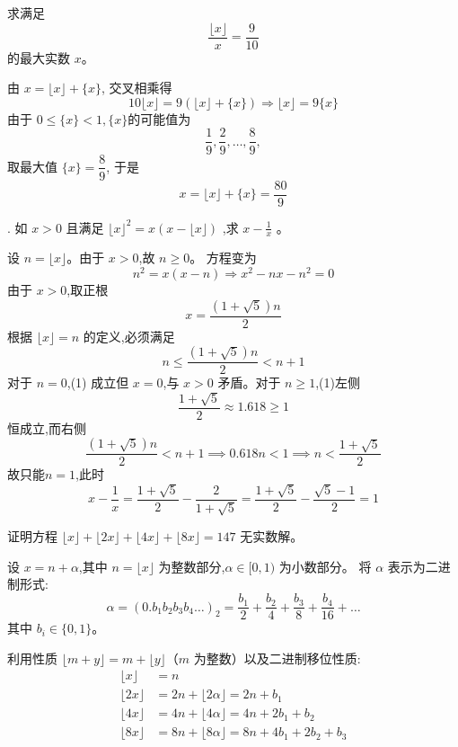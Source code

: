 \begin{questions}
    \question 求满足
    \[
    \frac{\lfloor x \rfloor}{x} = \frac{9}{10}
    \]
    的最大实数 $x$。
    \begin{solution}
        由 $x = \lfloor x \rfloor + \{x\}$, 交叉相乘得
        \[
        10 \lfloor x \rfloor = 9 (\lfloor x \rfloor + \{x\}) \Rightarrow \lfloor x \rfloor = 9 \{x\}
        \]
        由于 $0 \le \{x\} < 1,\{x\}$的可能值为
        \[
        \frac{1}{9}, \frac{2}{9}, \dots, \frac{8}{9}, 
        \]
        取最大值 $\{x\} = \dfrac{8}{9}$, 于是
        \[
        x = \lfloor x \rfloor + \{x\} = \frac{80}{9}
        \]
    \end{solution}
    
    . 如 $x > 0$ 且满足 $\lfloor x \rfloor^2 = x(x - \lfloor x \rfloor)$ ,求 $x - \frac{1}{x}$ 。
    \begin{solution}
        设 $n = \lfloor x \rfloor$。由于 $x > 0$,故 $n \ge 0$。
        方程变为
        \[ 
        n^2 = x(x - n) \Rightarrow x^2 - nx - n^2 = 0
        \]
        由于 $x > 0$,取正根
        \[ 
        x = \frac{(1 + \sqrt{5})n}{2} 
        \]
        根据 $\lfloor x \rfloor = n$ 的定义,必须满足
        \[ 
        n \le \frac{(1 + \sqrt{5})n}{2} < n + 1 \tag{1}
        \]
        对于 $n=0$,(1) 成立但 $x=0$,与 $x>0$ 矛盾。对于 $n \ge 1$,(1)左侧 
        \[
        \frac{1+\sqrt{5}}{2} \approx 1.618 \ge 1
        \]
        恒成立,而右侧
        \[
        \frac{(1 + \sqrt{5})n}{2} < n + 1 \implies 0.618n < 1 \implies n < \frac{1 + \sqrt{5}}{2}
        \]
        故只能$n = 1$,此时
        \[
        x - \frac{1}{x} = \frac{1 + \sqrt{5}}{2} - \frac{2}{1 + \sqrt{5}} = \frac{1 + \sqrt{5}}{2} - \frac{\sqrt{5} - 1}{2} = 1
        \]
    \end{solution}

\question 证明方程 $\lfloor x \rfloor + \lfloor 2x \rfloor + \lfloor 4x \rfloor + \lfloor 8x \rfloor = 147$ 无实数解。
\begin{solution}
    设 $x = n + \alpha$,其中 $n = \lfloor x \rfloor$ 为整数部分,$\alpha \in [0, 1)$ 为小数部分。
    将 $\alpha$ 表示为二进制形式:
    \[ \alpha = (0.b_1 b_2 b_3 b_4 \dots)_2 = \frac{b_1}{2} + \frac{b_2}{4} + \frac{b_3}{8} + \frac{b_4}{16} + \dots \]
    其中 $b_i \in \{0, 1\}$。

    利用性质 $\lfloor m + y \rfloor = m + \lfloor y \rfloor$（$m$ 为整数）以及二进制移位性质:
    \begin{align}
    \lfloor x \rfloor &= n \\
    \lfloor 2x \rfloor &= 2n + \lfloor 2\alpha \rfloor = 2n + b_1 \\
    \lfloor 4x \rfloor &= 4n + \lfloor 4\alpha \rfloor = 4n + 2b_1 + b_2 \\
    \lfloor 8x \rfloor &= 8n + \lfloor 8\alpha \rfloor = 8n + 4b_1 + 2b_2 + b_3
    \end{align}
   

\end{solution}
\end{questions}
